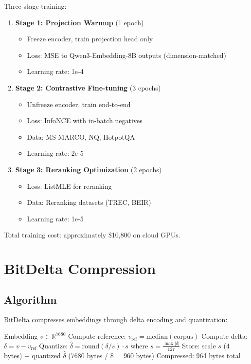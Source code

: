 \documentclass[11pt,letterpaper]{article}
\begin{document}
Three-stage training:

\begin{enumerate}
    \item \textbf{Stage 1: Projection Warmup} (1 epoch)
    \begin{itemize}
        \item Freeze encoder, train projection head only
        \item Loss: MSE to Qwen3-Embedding-8B outputs (dimension-matched)
        \item Learning rate: 1e-4
    \end{itemize}

    \item \textbf{Stage 2: Contrastive Fine-tuning} (3 epochs)
    \begin{itemize}
        \item Unfreeze encoder, train end-to-end
        \item Loss: InfoNCE with in-batch negatives
        \item Data: MS-MARCO, NQ, HotpotQA
        \item Learning rate: 2e-5
    \end{itemize}

    \item \textbf{Stage 3: Reranking Optimization} (2 epochs)
    \begin{itemize}
        \item Loss: ListMLE for reranking
        \item Data: Reranking datasets (TREC, BEIR)
        \item Learning rate: 1e-5
    \end{itemize}
\end{enumerate}

Total training cost: approximately \$10,800 on cloud GPUs.

\section{BitDelta Compression}
\label{sec:compression}

\subsection{Algorithm}

BitDelta compresses embeddings through delta encoding and quantization:

\begin{algorithm}
\caption{BitDelta Compression}
\label{alg:bitdelta}
\begin{algorithmic}[1]
\REQUIRE Embedding $v \in \mathbb{R}^{7680}$
\STATE Compute reference: $v_{\text{ref}} = \text{median}(\text{corpus})$
\STATE Compute delta: $\delta = v - v_{\text{ref}}$
\STATE Quantize: $\hat{\delta} = \text{round}(\delta / s) \cdot s$ where $s = \frac{\max|\delta|}{127}$
\STATE Store: scale $s$ (4 bytes) + quantized $\hat{\delta}$ (7680 bytes / 8 = 960 bytes)
\RETURN Compressed: 964 bytes total
\end{algorithmic}
\end{algorithm}
\end{document}
